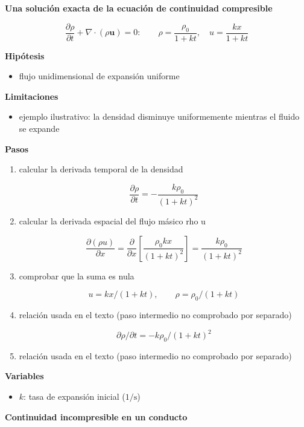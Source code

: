 \documentclass[10pt,openany]{book}
\begin{document}
\begin{tcolorbox}[title={Desarrollos del modelo}, studiumdef, breakable]

\noindent\textbf{Una solución exacta de la ecuación de continuidad compresible}

\[
\frac{\partial\rho}{\partial t} + \nabla\cdot(\rho\mathbf{u}) = 0:\qquad \rho = \frac{\rho_0}{1 + kt},\quad u = \frac{k x}{1 + kt}
\]

\noindent\textbf{Hipótesis}
\begin{itemize}
\item flujo unidimensional de expansión uniforme
\end{itemize}

\noindent\textbf{Limitaciones}
\begin{itemize}
\item ejemplo ilustrativo: la densidad disminuye uniformemente mientras el fluido se expande
\end{itemize}

\noindent\textbf{Pasos}
\begin{enumerate}
\item
calcular la derivada temporal de la densidad

\[
\frac{\partial\rho}{\partial t} = -\frac{k\rho_0}{(1 + kt)^{2}}
\]
\item
calcular la derivada espacial del flujo másico rho u

\[
\frac{\partial(\rho u)}{\partial x} = \frac{\partial}{\partial x}\left[\frac{\rho_0 k x}{(1 + kt)^{2}}\right] = \frac{k\rho_0}{(1 + kt)^{2}}
\]
\item
comprobar que la suma es nula

\[
u = kx/(1 + kt),\qquad \rho = \rho_0/(1 + kt)
\]
\item
relación usada en el texto (paso intermedio no comprobado por separado)

\[
\partial\rho/\partial t = -k\rho_0/(1 + kt)^{2}
\]
\item
relación usada en el texto (paso intermedio no comprobado por separado)
\end{enumerate}

\noindent\textbf{Variables}
\begin{itemize}
\item $k$: tasa de expansión inicial ($\mathrm{1/s}$)
\end{itemize}



\noindent\textbf{Continuidad incompresible en un conducto}


\end{tcolorbox}
\end{document}
